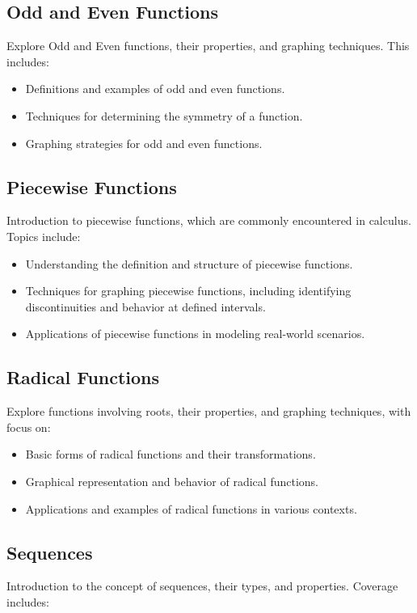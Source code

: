 \documentclass[a4paper,12pt]{book}
\begin{document}
\subsection{Odd and Even Functions}
\label{subsec:odd_even_functions}
Explore Odd and Even functions, their properties, and graphing techniques. This includes:


\begin{itemize}
    \item Definitions and examples of odd and even functions.
    \item Techniques for determining the symmetry of a function.
    \item Graphing strategies for odd and even functions.
\end{itemize}


\subsection{Piecewise Functions}
\label{subsec:piecewise_functions}
Introduction to piecewise functions, which are commonly encountered in calculus. Topics include:


\begin{itemize}
    \item Understanding the definition and structure of piecewise functions.
    \item Techniques for graphing piecewise functions, including identifying discontinuities and behavior at defined intervals.
    \item Applications of piecewise functions in modeling real-world scenarios.
\end{itemize}


\subsection{Radical Functions}
\label{subsec:radical_functions}
Explore functions involving roots, their properties, and graphing techniques, with focus on:


\begin{itemize}
    \item Basic forms of radical functions and their transformations.
    \item Graphical representation and behavior of radical functions.
    \item Applications and examples of radical functions in various contexts.
\end{itemize}


\subsection{Sequences}
\label{subsec:sequences}
Introduction to the concept of sequences, their types, and properties. Coverage includes:
\end{document}
